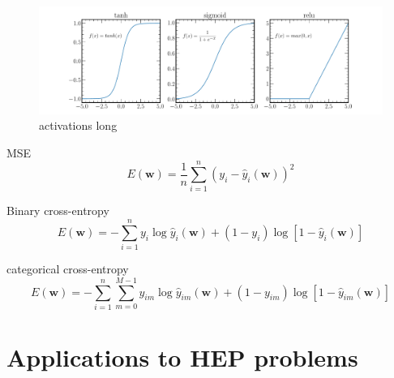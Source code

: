 %

\begin{figure}
    \includegraphics[width=\textwidth]{diagrams/6-cvn/activations.pdf}
    \caption[activations short]%
    {activations long}
    \label{fig:activations}
\end{figure}

MSE
\begin{equation}
    E(\boldsymbol{w})=\frac{1}{n}\displaystyle\sum_{i=1}^{n}(y_{i}-\hat{y}_{i}(\boldsymbol{w}))^{2}
\end{equation}

Binary cross-entropy
\begin{equation}
    E(\boldsymbol{w})=-\displaystyle\sum_{i=1}^{n}y_{i}\log\hat{y}_{i}(\boldsymbol{w})+(1-y_{i})\log[1-\hat{y}_{i}(\boldsymbol{w})]
\end{equation}

categorical cross-entropy
\begin{equation}
    E(\boldsymbol{w})=-\displaystyle\sum_{i=1}^{n}\displaystyle\sum_{m=0}^{M-1}y_{im}\log\hat{y}_{im}(\boldsymbol{w})+(1-y_{im})\log[1-\hat{y}_{im}(\boldsymbol{w})]
\end{equation}


\section{Applications to HEP problems}

